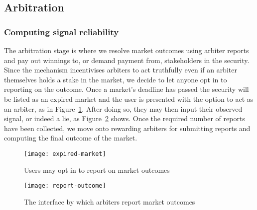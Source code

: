 \subsection{Arbitration}

\label{sec:arbitration}

\subsubsection{Computing signal reliability}

The arbitration stage is where we resolve market outcomes using arbiter reports
and pay out winnings to, or demand payment from, stakeholders in the security.
Since the mechanism incentivises arbiters to act truthfully even if an arbiter
themselves holds a stake in the market, we decide to let anyone opt in to
reporting on the outcome. Once a market's deadline has passed the security will
be listed as an expired market and the user is presented with the option to act
as an arbiter, as in Figure~\ref{fig:expiredMarket}. After doing so, they may
then input their observed signal, or indeed a lie, as
Figure~\ref{fig:reportOutcome} shows.  Once the required number of reports have
been collected, we move onto rewarding arbiters for submitting reports and
computing the final outcome of the market.

\begin{figure}[h]
	\centering
	\texttt{[image: expired-market]}
	\caption{Users may opt in to report on market outcomes}
	\label{fig:expiredMarket}
\end{figure}

\begin{figure}[h]
	\centering
	\texttt{[image: report-outcome]}
	\caption{The interface by which arbiters report market outcomes}
	\label{fig:reportOutcome}
\end{figure}

